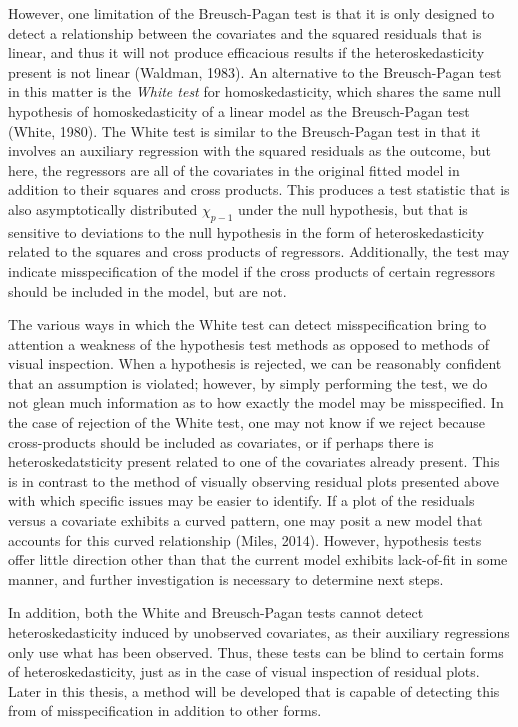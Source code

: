 		However, one limitation of the Breusch-Pagan test is that it is only designed to detect a relationship between the covariates and the squared residuals that is linear, and thus it will not
		produce efficacious results if the heteroskedasticity present is not linear (Waldman, 1983). An alternative to the Breusch-Pagan test in this matter is the \textit{White test} for homoskedasticity,
		which shares the same null hypothesis of homoskedasticity of a linear model as the Breusch-Pagan test (White, 1980). The White test is similar to the Breusch-Pagan test in that it involves
		an auxiliary regression with the squared residuals as the outcome, but here, the regressors are all of the covariates in the original fitted model in addition to their squares and cross
		products. This produces a test statistic that is also asymptotically distributed $\chi_{p-1}$ under the null hypothesis, but that is sensitive to deviations to the null hypothesis in the form of
		heteroskedasticity related to the squares and cross products of regressors. Additionally, the test may indicate misspecification of the model if the cross products of certain
		regressors should be included in the model, but are not.

		The various ways in which the White test can detect misspecification bring to attention a weakness of the hypothesis test methods as opposed to methods of visual inspection.
		When a hypothesis is rejected, we can be reasonably confident that an assumption is violated; however, by simply performing the test, we do not glean much information as to how exactly the
		model may be misspecified. In the case of rejection of the White test, one may not know if we reject because cross-products should be included as covariates, or if perhaps there is heteroskedatsticity
		present related to one of the covariates already present. This is in contrast to the method of visually observing residual plots presented above with which specific issues may be easier to identify.
		If a plot of the residuals versus a covariate exhibits a curved pattern, one may posit a new model that accounts for this curved relationship (Miles, 2014).
		However, hypothesis tests offer little direction other than that the current model exhibits lack-of-fit in some manner, and further investigation is necessary to determine next steps.

		In addition, both the White and Breusch-Pagan tests cannot detect heteroskedasticity induced by unobserved covariates, as their auxiliary regressions only use what has been observed.
		Thus, these tests can be blind to certain forms of heteroskedasticity, just as in the case of visual inspection of residual plots. Later in this thesis, a method will be developed
		that is capable of detecting this from of misspecification in addition to other forms.

